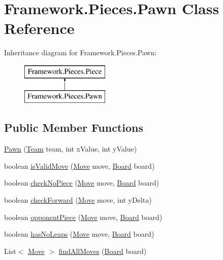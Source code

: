\hypertarget{class_framework_1_1_pieces_1_1_pawn}{}\section{Framework.\+Pieces.\+Pawn Class Reference}
\label{class_framework_1_1_pieces_1_1_pawn}
Inheritance diagram for Framework.\+Pieces.\+Pawn\+:\begin{figure}[H]
\begin{center}
\leavevmode
\includegraphics[height=2.000000cm]{class_framework_1_1_pieces_1_1_pawn}
\end{center}
\end{figure}
\subsection*{Public Member Functions}
\begin{DoxyCompactItemize}
\item 
\hyperlink{class_framework_1_1_pieces_1_1_pawn_a468f5a838c9a2f68365dc5060f92ce07}{Pawn} (\hyperlink{class_framework_1_1_team}{Team} team, int x\+Value, int y\+Value)
\item 
boolean \hyperlink{class_framework_1_1_pieces_1_1_pawn_a85be7f651332fcae0231f4b16e2d6e11}{is\+Valid\+Move} (\hyperlink{class_framework_1_1_move}{Move} move, \hyperlink{class_framework_1_1_board}{Board} board)
\item 
boolean \hyperlink{class_framework_1_1_pieces_1_1_pawn_ac1d28a30f35296bc46384a28ba46f48d}{check\+No\+Piece} (\hyperlink{class_framework_1_1_move}{Move} move, \hyperlink{class_framework_1_1_board}{Board} board)
\item 
boolean \hyperlink{class_framework_1_1_pieces_1_1_pawn_a05c399a7a14de3df4b4a72dfd06a554a}{check\+Forward} (\hyperlink{class_framework_1_1_move}{Move} move, int y\+Delta)
\item 
boolean \hyperlink{class_framework_1_1_pieces_1_1_pawn_aab0b976104c3c3c0f97bd27facb274b6}{opponent\+Piece} (\hyperlink{class_framework_1_1_move}{Move} move, \hyperlink{class_framework_1_1_board}{Board} board)
\item 
boolean \hyperlink{class_framework_1_1_pieces_1_1_pawn_af5cfe8dc9ff5e669186b6257d674984d}{has\+No\+Leaps} (\hyperlink{class_framework_1_1_move}{Move} move, \hyperlink{class_framework_1_1_board}{Board} board)
\item 
List$<$ \hyperlink{class_framework_1_1_move}{Move} $>$ \hyperlink{class_framework_1_1_pieces_1_1_pawn_aefb4da1ff1fe2d9bb73f3260be89ebae}{find\+All\+Moves} (\hyperlink{class_framework_1_1_board}{Board} board)
\end{DoxyCompactItemize}


